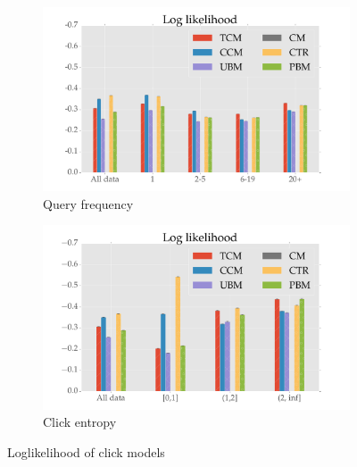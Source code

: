\begin{figure}
	\centering
	\begin{subfigure}[b]{.49\textwidth}
	\centering
		\includegraphics[width=\textwidth]{figures/LL_qf.pdf}
		\caption{Query frequency}
		\label{fig:ll_qf}
	\end{subfigure}
	\begin{subfigure}[b]{.49\textwidth}
		\centering
		\includegraphics[width=\textwidth]{figures/LL_ce.pdf}
		\caption{Click entropy}
		\label{fig:ll_ce}
	\end{subfigure}
	\caption{Loglikelihood of click models}
\end{figure}


